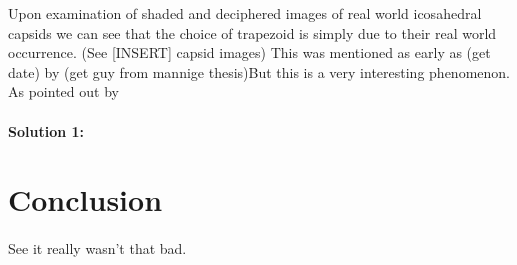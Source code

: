 \documentclass[12pt,letter]{article}
\begin{document}
Upon examination of shaded and deciphered images of real world icosahedral capsids we can see that the choice of trapezoid is simply due to their real world occurrence. (See [INSERT] capsid images) This was mentioned as early as (get date) by (get guy from mannige thesis)But this is a very interesting phenomenon. As pointed out by 

\paragraph{Solution 1:}


\section{Conclusion}
\paragraph{}
See it really wasn't that bad.

\newpage


\end{document}
